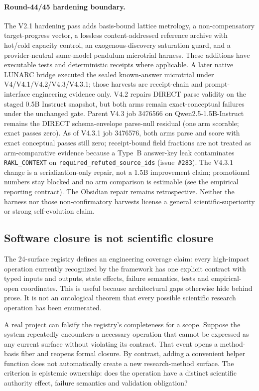 \paragraph{Round-44/45 hardening boundary.}
The V2.1 hardening pass adds basis-bound lattice metrology, a non-compensatory target-progress vector, a lossless content-addressed reference archive with hot/cold capacity control, an exogenous-discovery saturation guard, and a provider-neutral same-model pendulum microtrial harness. These additions have executable tests and deterministic receipts where applicable. A later native LUNARC bridge executed the sealed known-answer microtrial under V4/V4.1/V4.2/V4.3/V4.3.1; those harvests are receipt-chain and prompt-interface engineering evidence only. V4.2 repairs DIRECT parse validity on the staged 0.5B Instruct snapshot, but both arms remain exact-conceptual failures under the unchanged gate. Parent V4.3 job 3476566 on Qwen2.5-1.5B-Instruct remains the DIRECT schema-envelope parse-null residual (one arm scorable; exact passes zero). As of V4.3.1 job 3476576, both arms parse and score with exact conceptual passes still zero; receipt-bound field fractions are not treated as arm-comparative evidence because a Type~B answer-key leak contaminates \texttt{RAKL\_CONTEXT} on \texttt{required\_refuted\_source\_ids} (issue~\texttt{\#283}). The V4.3.1 change is a serialization-only repair, not a 1.5B improvement claim; promotional numbers stay blocked and no arm comparison is estimable (see the empirical reporting contract). The Obsidian repair remains retrospective. Neither the harness nor those non-confirmatory harvests license a general scientific-superiority or strong self-evolution claim.

\subsection{Software closure is not scientific closure}

The 24-surface registry defines an engineering coverage claim: every high-impact operation currently recognized by the framework has one explicit contract with typed inputs and outputs, state effects, failure semantics, tests and empirical-open coordinates. This is useful because architectural gaps otherwise hide behind prose. It is not an ontological theorem that every possible scientific research operation has been enumerated.

A real project can falsify the registry's completeness for a scope. Suppose the system repeatedly encounters a necessary operation that cannot be expressed as any current surface without violating its contract. That event opens a method-basis fiber and reopens formal closure. By contrast, adding a convenient helper function does not automatically create a new research-method surface. The criterion is epistemic ownership: does the operation have a distinct scientific authority effect, failure semantics and validation obligation?

